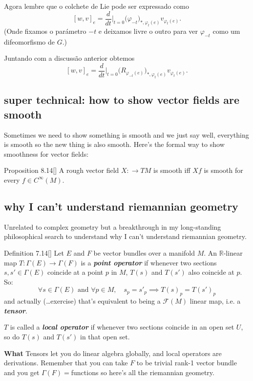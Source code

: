 Agora lembre que o colchete de Lie pode ser expressado como
\[[w,v]_e=\frac{d}{dt}\Big|_{t=0}\Big(\varphi_{-t}\Big)_{*,\varphi_t(e)}v_{\varphi_t(e)}.\]
(Onde fixamos o parámetro \(-t\) e deixamos livre o outro para ver \(\varphi_{-t}\) como um difeomorfismo de \(G\).)

Juntando com a discussão anterior obtemos
\[[w,v]_e=\frac{d}{dt}\Big|_{t=0}\Big(R_{\varphi_{-t}(e)}\Big)_{*,\varphi_t(e)}v_{\varphi_t(e)}.\]



\subsection{super technical: how to show vector fields are smooth}

Sometimes we need to show something is smooth and we just say well, everything is smooth so the new thing is also smooth. Here's the formal way to show smoothness for vector fields:

\begin{thing7}{Proposition 8.14}[\cite{les}]\leavevmode
A rough vector field \(X : \to TM\) is smooth iff \(Xf\) is smooth for every \(f\in C^\infty(M)\).
\end{thing7}

\subsection{why I can't understand riemannian geometry}

Unrelated to complex geometry but a breakthrough in my long-standing philosophical search to understand why I can't understand riemannian geometry.

\begin{thing4}{Definition 7.14}[\cite{tud}]\label{def:7.14}\leavevmode
Let \(E\) and \(F\) be vector bundles over a manifold \(M\). An \(\mathbb{R}\)-linear map \(T:\Gamma(E)\longrightarrow \Gamma(F)\) is a \textit{\textbf{point operator}} if whenever two sections \(s,s' \in \Gamma(E)\) coincide at a point \(p\) in \(M\), \(T(s)\) and \(T(s')\) also coincide at \(p\). So:
\[\forall s \in \Gamma(E)\text{ and } \forall  p \in M, \quad s_p=s'_p \implies T(s)_p=T(s')_p\]
and actually (…exercise) that's equivalent to being a \(\mathcal{F}(M)\) linear map, i.e. a \textit{\textbf{tensor}}.

\(T\) is called a \textit{\textbf{local operator}} if whenever two sections coincide in an open set \(U\), so do \(T(s)\) and  \(T(s')\) in that open set.

{\color{2}\bfseries What}\hspace{.5em} Tensors let you do linear algebra globally, and local operators are derivations. Remember that you can take \(F\) to be trivial rank-1 vector bundle and you get \(\Gamma(F)=\)functions so here's all the riemannian geometry.
\end{thing4}

